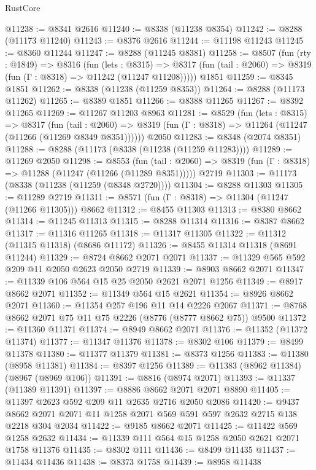 \begin{lexlean}{RustCore}
\begin{coremodule}
@11238 := @8341 @2616
@11240 := @8338 (@11238 @8354)
@11242 := @8288 (@11173 @11240)
@11243 := @8376 @2616
@11244 := @11198 @11243
@11245 := @8360 @11244
@11247 := @8288 (@11245 @8381)
@11258 := @8507
    (fun (rty : @1849) =>
    @8316
      (fun (lets : @8315) =>
      @8317 (fun (tail : @2060) => @8319 (fun (Γ : @8318) => @11242 (@11247 @11208)))))
    @1851
@11259 := @8345 @1851
@11262 := @8338 (@11238 (@11259 @8353))
@11264 := @8288 (@11173 @11262)
@11265 := @8389 @1851
@11266 := @8388 @11265
@11267 := @8392 @11265
@11269 := @11267 @11203 @8963
@11281 := @8529
    (fun (lets : @8315) =>
    @8317
      (fun (tail : @2060) =>
      @8319 (fun (Γ : @8318) => @11264 (@11247 (@11266 (@11269 @8349 @8351))))))
    @2050
@11283 := @8348 (@2074 @8351)
@11288 := @8288 (@11173 (@8338 (@11238 (@11259 @11283))))
@11289 := @11269 @2050
@11298 := @8553
    (fun (tail : @2060) => @8319 (fun (Γ : @8318) => @11288 (@11247 (@11266 (@11289 @8351)))))
    @2719
@11303 := @11173 (@8338 (@11238 (@11259 (@8348 @2720))))
@11304 := @8288 @11303
@11305 := @11289 @2719
@11311 := @8571 (fun (Γ : @8318) => @11304 (@11247 (@11266 @11305))) @8662
@11312 := @8455 @11303
@11313 := @8380 @8662
@11314 := @11245 @11313
@11315 := @8288 @11314
@11316 := @8387 @8662
@11317 := @11316 @11265
@11318 := @11317 @11305
@11322 := @11312 (@11315 @11318) (@8686 @11172)
@11326 := @8455 @11314 @11318 (@8691 @11244)
@11329 := @8724 @8662 @2071 @2071
@11337 := @11329 @565 @592 @209 @11 @2050 @2623 @2050 @2719
@11339 := @8903 @8662 @2071
@11347 := @11339 @106 @564 @15 @25 @2050 @2621 @2071 @1256
@11349 := @8917 @8662 @2071
@11352 := @11349 @564 @15 @2621
@11354 := @8926 @8662 @2071
@11360 := @11354 @257 @196 @11 @14 @2226 @2067
@11371 := @8768 @8662 @2071 @75 @11 @75 @2226 (@8776 (@8777 @8662 @75)) @9500
@11372 := @11360 @11371
@11374 := @8949 @8662 @2071
@11376 := @11352 (@11372 @11374)
@11377 := @11347 @11376
@11378 := @8302 @106
@11379 := @8499 @11378
@11380 := @11377 @11379
@11381 := @8373 @1256
@11383 := @11380 (@8958 @11381)
@11384 := @8397 @1256
@11389 := @11383 (@8962 @11384) (@8967 (@8969 @106))
@11391 := @8816 (@8974 @2071)
@11393 := @11337 (@11389 @11391)
@11397 := @8886 @8662 @2071 @2071 @8890
@11405 := @11397 @2623 @592 @209 @11 @2635 @2716 @2050 @2086
@11420 := @9437 @8662 @2071 @2071 @11 @1258 @2071 @569 @591 @597 @2632 @2715 @138 @2218 @304 @2034
@11422 := @9185 @8662 @2071
@11425 := @11422 @569 @1258 @2632
@11434 := @11339 @111 @564 @15 @1258 @2050 @2621 @2071 @1758 @11376
@11435 := @8302 @111
@11436 := @8499 @11435
@11437 := @11434 @11436
@11438 := @8373 @1758
@11439 := @8958 @11438

\end{coremodule}
\end{lexlean}
